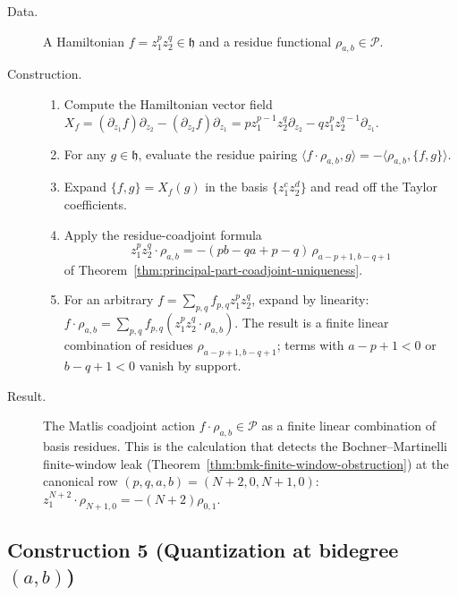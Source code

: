 \begin{description}
\item[Data.]  A Hamiltonian \(f=z_1^pz_2^q\in\mathfrak h\) and a
residue functional \(\rho_{a,b}\in\mathcal P\).
\item[Construction.]
\begin{enumerate}
\item Compute the Hamiltonian vector field
\(X_f=(\partial_{z_1}f)\partial_{z_2}-(\partial_{z_2}f)\partial_{z_1}
=pz_1^{p-1}z_2^q\partial_{z_2}-qz_1^pz_2^{q-1}\partial_{z_1}\).
\item For any \(g\in\mathfrak h\), evaluate the residue pairing
\(\langle f\!\cdot\!\rho_{a,b},g\rangle=-\langle\rho_{a,b},\{f,g\}\rangle\).
\item Expand \(\{f,g\}=X_f(g)\) in the basis \(\{z_1^cz_2^d\}\) and
read off the Taylor coefficients.
\item Apply the residue-coadjoint formula
\[
  z_1^pz_2^q\!\cdot\!\rho_{a,b}
  =-(pb-qa+p-q)\,\rho_{a-p+1,b-q+1}
\]
of Theorem~\ref{thm:principal-part-coadjoint-uniqueness}.
\item For an arbitrary \(f=\sum_{p,q}f_{p,q}z_1^pz_2^q\), expand by
linearity:
\(f\cdot\rho_{a,b}=\sum_{p,q}f_{p,q}(z_1^pz_2^q\cdot\rho_{a,b})\).
The result is a finite linear combination of residues
\(\rho_{a-p+1,b-q+1}\); terms with \(a-p+1<0\) or \(b-q+1<0\) vanish
by support.
\end{enumerate}
\item[Result.]  The Matlis coadjoint action
\(f\cdot\rho_{a,b}\in\mathcal P\) as a finite linear combination of
basis residues.  This is the calculation that detects the
Bochner--Martinelli finite-window leak
(Theorem~\ref{thm:bmk-finite-window-obstruction}) at the canonical row
\((p,q,a,b)=(N+2,0,N+1,0)\):
\(z_1^{N+2}\cdot\rho_{N+1,0}=-(N+2)\rho_{0,1}\).
\end{description}

\subsection*{Construction 5 (Quantization at bidegree \((a,b)\))}\label{algo:quantization}

